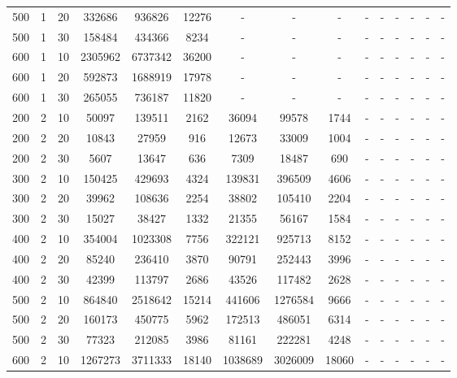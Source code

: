 \documentclass{article}
\begin{document}
\begin{table}[H]
\begin{center}
\begin{tabular}{| c | c | c | c | c | c | c | c | c | c | c | c | c | c | c |}
                    500 & 1 & 20 & 332686 & 936826 & 12276 & - & - & - & - & - & - & - & - & - \\
                    500 & 1 & 30 & 158484 & 434366 & 8234 & - & - & - & - & - & - & - & - & - \\
                    600 & 1 & 10 & 2305962 & 6737342 & 36200 & - & - & - & - & - & - & - & - & - \\
                    600 & 1 & 20 & 592873 & 1688919 & 17978 & - & - & - & - & - & - & - & - & - \\
                    600 & 1 & 30 & 265055 & 736187 & 11820 & - & - & - & - & - & - & - & - & - \\
                    200 & 2 & 10 & 50097 & 139511 & 2162 & 36094 & 99578 & 1744 & - & - & - & - & - & - \\
                    200 & 2 & 20 & 10843 & 27959 & 916 & 12673 & 33009 & 1004 & - & - & - & - & - & - \\
                    200 & 2 & 30 & 5607 & 13647 & 636 & 7309 & 18487 & 690 & - & - & - & - & - & - \\
                    300 & 2 & 10 & 150425 & 429693 & 4324 & 139831 & 396509 & 4606 & - & - & - & - & - & - \\
                    300 & 2 & 20 & 39962 & 108636 & 2254 & 38802 & 105410 & 2204 & - & - & - & - & - & - \\
                    300 & 2 & 30 & 15027 & 38427 & 1332 & 21355 & 56167 & 1584 & - & - & - & - & - & - \\
                    400 & 2 & 10 & 354004 & 1023308 & 7756 & 322121 & 925713 & 8152 & - & - & - & - & - & - \\
                    400 & 2 & 20 & 85240 & 236410 & 3870 & 90791 & 252443 & 3996 & - & - & - & - & - & - \\
                    400 & 2 & 30 & 42399 & 113797 & 2686 & 43526 & 117482 & 2628 & - & - & - & - & - & - \\
                    500 & 2 & 10 & 864840 & 2518642 & 15214 & 441606 & 1276584 & 9666 & - & - & - & - & - & - \\
                    500 & 2 & 20 & 160173 & 450775 & 5962 & 172513 & 486051 & 6314 & - & - & - & - & - & - \\
                    500 & 2 & 30 & 77323 & 212085 & 3986 & 81161 & 222281 & 4248 & - & - & - & - & - & - \\
                    600 & 2 & 10 & 1267273 & 3711333 & 18140 & 1038689 & 3026009 & 18060 & - & - & - & - & - & - \\

\end{tabular}
\end{center}
\end{table}
\end{document}

